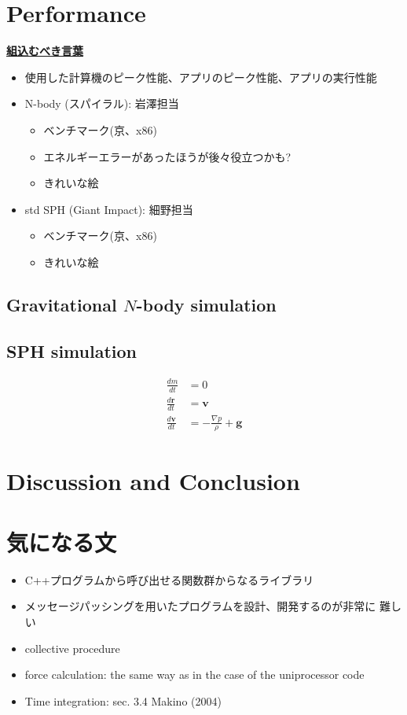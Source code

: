 \documentclass[12pt,a4paper]{jarticle}
\newcommand{\underbold}[1]{\underline{\bf #1}}
\begin{document}
\section{Performance}

\underbold{組込むべき言葉}
\begin{itemize}
\item 使用した計算機のピーク性能、アプリのピーク性能、アプリの実行性能
\end{itemize}

\begin{itemize}
\item N-body (スパイラル): 岩澤担当
  \begin{itemize}
  \item ベンチマーク(京、x86)
  \item エネルギーエラーがあったほうが後々役立つかも?
  \item きれいな絵
  \end{itemize}
\item std SPH (Giant Impact): 細野担当
  \begin{itemize}
  \item ベンチマーク(京、x86)
  \item きれいな絵
  \end{itemize}
\end{itemize}

\subsection{Gravitational $N$-body simulation}

\subsection{SPH simulation}

\begin{align}
  \frac{dm}{dt} &= 0 \\
  \frac{d\bm{r}}{dt} &= \bm{v} \\
  \frac{d\bm{v}}{dt} &= - \frac{\nabla p}{\rho} + \bm{g}
\end{align}

\section{Discussion and Conclusion}

\section{気になる文}

\begin{itemize}
\item C++プログラムから呼び出せる関数群からなるライブラリ
\item メッセージパッシングを用いたプログラムを設計、開発するのが非常に
  難しい
\item collective procedure
\item force calculation: the same way as in the case of the
  uniprocessor code
\item Time integration: sec. 3.4 Makino (2004)
\end{itemize}
\end{document}
